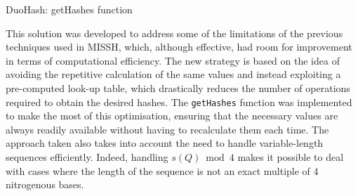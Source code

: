 \begin{algorithm}[!ht]
	\caption{DuoHash: getHashes function}
	\label{alg:DuoHash}
	
\end{algorithm}

This solution was developed to address some of the limitations of the previous techniques used in \acs{MISSH}, which, although effective, had room for improvement in terms of computational efficiency. The new strategy is based on the idea of avoiding the repetitive calculation of the same values and instead exploiting a pre-computed look-up table, which drastically reduces the number of operations required to obtain the desired hashes. The \verb|getHashes| function was implemented to make the most of this optimisation, ensuring that the necessary values are always readily available without having to recalculate them each time. The approach taken also takes into account the need to handle variable-length sequences efficiently. Indeed, handling $s(Q) \bmod 4$ makes it possible to deal with cases where the length of the sequence is not an exact multiple of 4 nitrogenous bases. 

